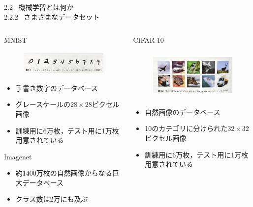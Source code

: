 \documentclass[dvipdfmx,8pt]{beamer}
\begin{document}
  \begin{frame}[t]{2.2 \ 機械学習とは何か \\ \normalsize{2.2.2 \ さまざまなデータセット}}
    \begin{columns}
      \begin{column}{0.5\textwidth}
        MNIST
        \begin{figure}
          \begin{center}
            \includegraphics[height=1.2cm]{./MNIST.jpeg}
          \end{center}   
        \end{figure}
        \begin{itemize}
          \item 手書き数字のデータベース
          \item グレースケールの$28 \times 28$ピクセル画像
          \item 訓練用に6万枚，テスト用に1万枚用意されている
        \end{itemize}
        Imagenet
        \begin{itemize}
          \item 約1400万枚の自然画像からなる巨大データベース
          \item クラス数は2万にも及ぶ
        \end{itemize}
      \end{column}
      \begin{column}{0.5\textwidth}
        CIFAR-10
        \begin{figure}
          \begin{center}
            \includegraphics[height=2.5cm]{./CIFAR10.jpeg}
          \end{center}   
        \end{figure}
        \begin{itemize}
          \item 自然画像のデータベース
          \item 10のカテゴリに分けられた$32 \times 32$ピクセル画像
          \item 訓練用に6万枚，テスト用に1万枚用意されている
        \end{itemize}
      \end{column}
    \end{columns}
  \end{frame}
\end{document}
